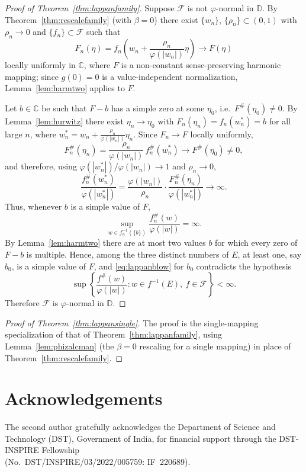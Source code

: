 \documentclass[11pt,reqno]{amsart}
\theoremstyle{definition}
\newcommand{\D}{\mathbb{D}}
\newcommand{\C}{\mathbb{C}}
\begin{document}
\begin{proof}[Proof of Theorem~\textup{\ref{thm:lappanfamily}}]
Suppose $\mathcal F$ is not $\varphi$-normal in $\D$. By Theorem~\ref{thm:rescalefamily}
(with $\beta=0$) there exist $\{w_{n}\}$, $\{\rho_{n}\}\subset(0,1)$ with $\rho_{n}\to0$ and
$\{f_{n}\}\subset\mathcal F$ such that
\[
F_{n}(\eta)=f_{n}\!\left(w_{n}+\frac{\rho_{n}}{\varphi(|w_{n}|)}\eta\right)\longrightarrow F(\eta)
\]
locally uniformly in $\C$, where $F$ is a non-constant sense-preserving harmonic mapping;
since $g(0)=0$ is a value-independent normalization, Lemma~\ref{lem:harmtwo} applies to $F$.

Let $b\in\C$ be such that $F-b$ has a simple zero at some $\eta_{0}$, i.e.\
$F^{\#}(\eta_{0})\neq0$. By Lemma~\ref{lem:hurwitz} there exist $\eta_{n}\to\eta_{0}$ with
$F_{n}(\eta_{n})=f_{n}(w_{n}^{*})=b$ for all large $n$, where
$w_{n}^{*}=w_{n}+\tfrac{\rho_{n}}{\varphi(|w_{n}|)}\eta_{n}$. Since $F_{n}\to F$ locally
uniformly,
\[
F_{n}^{\#}(\eta_{n})=\frac{\rho_{n}}{\varphi(|w_{n}|)}\,f_{n}^{\#}(w_{n}^{*})
\longrightarrow F^{\#}(\eta_{0})\neq0,
\]
and therefore, using $\varphi(|w_{n}^{*}|)/\varphi(|w_{n}|)\to1$ and $\rho_{n}\to0$,
\[
\frac{f_{n}^{\#}(w_{n}^{*})}{\varphi(|w_{n}^{*}|)}
=\frac{\varphi(|w_{n}|)}{\rho_{n}}\cdot\frac{F_{n}^{\#}(\eta_{n})}{\varphi(|w_{n}^{*}|)}
\longrightarrow\infty.
\]
Thus, whenever $b$ is a simple value of $F$,
\begin{equation}\label{eq:lappanblow}
\sup_{w\in f_{n}^{-1}(\{b\})}\frac{f_{n}^{\#}(w)}{\varphi(|w|)}=\infty.
\end{equation}
By Lemma~\ref{lem:harmtwo} there are at most two values $b$ for which every zero of $F-b$ is
multiple. Hence, among the three distinct numbers of $E$, at least one, say $b_{0}$, is a
simple value of $F$, and \eqref{eq:lappanblow} for $b_{0}$ contradicts the hypothesis
\[
\sup\left\{\frac{f^{\#}(w)}{\varphi(|w|)}:w\in f^{-1}(E),\ f\in\mathcal F\right\}<\infty.
\]
Therefore $\mathcal F$ is $\varphi$-normal in $\D$.
\end{proof}

\begin{proof}[Proof of Theorem~\textup{\ref{thm:lappansingle}}]
The proof is the single-mapping specialization of that of
Theorem~\ref{thm:lappanfamily}, using Lemma~\ref{lem:phizalcman} (the $\beta=0$ rescaling
for a single mapping) in place of Theorem~\ref{thm:rescalefamily}.
\end{proof}

\section*{Acknowledgements}
The second author gratefully acknowledges the Department of Science and Technology (DST),
Government of India, for financial support through the DST-INSPIRE Fellowship\\
(No.\ DST/INSPIRE/03/2022/005759: IF~220689).
\end{document}
